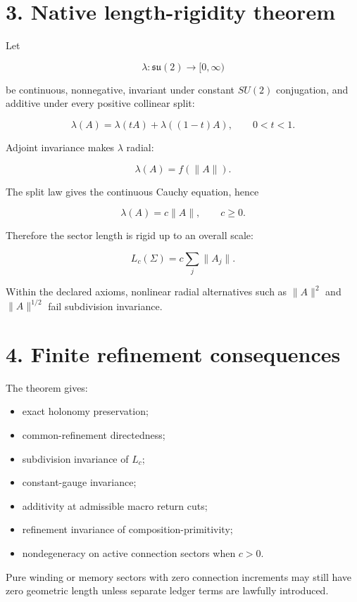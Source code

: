 \hypertarget{native-length-rigidity-theorem}{%
\section{3. Native length-rigidity theorem}\label{native-length-rigidity-theorem}}

Let

\[
\lambda:\mathfrak{su}(2)\to[0,\infty)
\]

be continuous, nonnegative, invariant under constant \(SU(2)\) conjugation, and additive under every positive collinear split:

\[
\lambda(A)=\lambda(tA)+\lambda((1-t)A),
\qquad 0<t<1.
\]

Adjoint invariance makes \(\lambda\) radial:

\[
\lambda(A)=f(\|A\|).
\]

The split law gives the continuous Cauchy equation, hence

\[
\boxed{\lambda(A)=c\|A\|,\qquad c\ge0.}
\]

Therefore the sector length is rigid up to an overall scale:

\[
\boxed{L_c(\Sigma)=c\sum_j\|A_j\|.}
\]

Within the declared axioms, nonlinear radial alternatives such as \(\|A\|^2\) and \(\|A\|^{1/2}\) fail subdivision invariance.

\hypertarget{finite-refinement-consequences}{%
\section{4. Finite refinement consequences}\label{finite-refinement-consequences}}

The theorem gives:

\begin{itemize}
\tightlist
\item
  exact holonomy preservation;
\item
  common-refinement directedness;
\item
  subdivision invariance of \(L_c\);
\item
  constant-gauge invariance;
\item
  additivity at admissible macro return cuts;
\item
  refinement invariance of composition-primitivity;
\item
  nondegeneracy on active connection sectors when \(c>0\).
\end{itemize}

Pure winding or memory sectors with zero connection increments may still have zero geometric length unless separate ledger terms are lawfully introduced.

